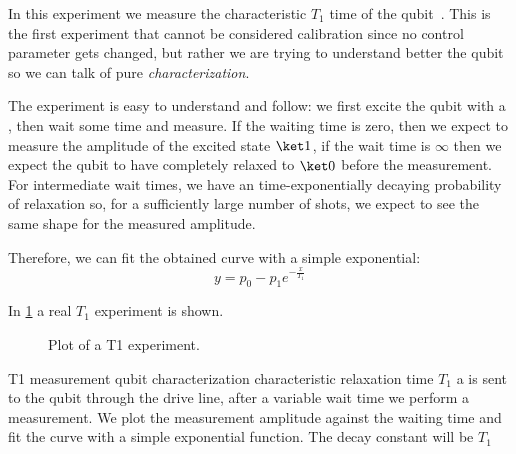 
In this experiment we measure the characteristic $T_1$ time of the qubit~\cite{Klimov2018}.
This is the first experiment that cannot be considered calibration since no control parameter gets changed, but rather we are trying to understand better the qubit so we can talk of pure \textit{characterization}.

The experiment is easy to understand and follow: we first excite the qubit with a \pipulse, then wait some time and measure. 
If the waiting time is zero, then we expect to measure the amplitude of the excited state $\ket 1$, if the wait time is $\infty$ then we expect the qubit to have completely relaxed to $\ket 0$ before the measurement.
For intermediate wait times, we have an time-exponentially decaying probability of relaxation so, for a sufficiently large number of shots, we expect to see the same shape for the measured amplitude.

Therefore, we can fit the obtained curve with a simple exponential:
\begin{equation}
    y = p_0 - p_1 e^{-\frac{x}{T_1}}
\end{equation}

In \cref{fig:t1_experiment} a real $T_1$ experiment is shown.
\begin{figure}[ht]
    \caption{Plot of a T1 experiment.}
    \label{fig:t1_experiment}
\end{figure}


\experimentrecap
{T1 measurement}
{qubit characterization}
{characteristic relaxation time $T_1$}
{a \pipulse is sent to the qubit through the drive line, after a variable wait time we perform a measurement. We plot the measurement amplitude against the waiting time and fit the curve with a simple exponential function. The decay constant will be $T_1$}
